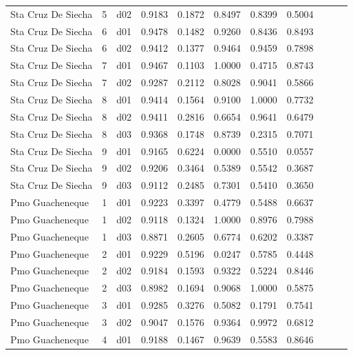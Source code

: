 \begin{landscape}
\begin{longtable}{p{5cm}rrrrrrrrrr}
   Sta Cruz De Siecha  & 5 &     d02 &   0.9183 &  0.1872 &    0.8497 &   0.8399 &    0.5004 \\
   Sta Cruz De Siecha  & 6 &     d01 &   0.9478 &  0.1482 &    0.9260 &   0.8436 &    0.8493 \\
   Sta Cruz De Siecha  & 6 &     d02 &   0.9412 &  0.1377 &    0.9464 &   0.9459 &    0.7898 \\
   Sta Cruz De Siecha  & 7 &     d01 &   0.9467 &  0.1103 &    1.0000 &   0.4715 &    0.8743 \\
   Sta Cruz De Siecha  & 7 &     d02 &   0.9287 &  0.2112 &    0.8028 &   0.9041 &    0.5866 \\
   Sta Cruz De Siecha  & 8 &     d01 &   0.9414 &  0.1564 &    0.9100 &   1.0000 &    0.7732 \\
   Sta Cruz De Siecha  & 8 &     d02 &   0.9411 &  0.2816 &    0.6654 &   0.9641 &    0.6479 \\
   Sta Cruz De Siecha  & 8 &     d03 &   0.9368 &  0.1748 &    0.8739 &   0.2315 &    0.7071 \\
   Sta Cruz De Siecha  & 9 &     d01 &   0.9165 &  0.6224 &    0.0000 &   0.5510 &    0.0557 \\
   Sta Cruz De Siecha  & 9 &     d02 &   0.9206 &  0.3464 &    0.5389 &   0.5542 &    0.3687 \\
   Sta Cruz De Siecha  & 9 &     d03 &   0.9112 &  0.2485 &    0.7301 &   0.5410 &    0.3650 \\
      Pmo Guacheneque  & 1 &     d01 &   0.9223 &  0.3397 &    0.4779 &   0.5488 &    0.6637 \\
      Pmo Guacheneque  & 1 &     d02 &   0.9118 &  0.1324 &    1.0000 &   0.8976 &    0.7988 \\
      Pmo Guacheneque  & 1 &     d03 &   0.8871 &  0.2605 &    0.6774 &   0.6202 &    0.3387 \\
      Pmo Guacheneque  & 2 &     d01 &   0.9229 &  0.5196 &    0.0247 &   0.5785 &    0.4448 \\
      Pmo Guacheneque  & 2 &     d02 &   0.9184 &  0.1593 &    0.9322 &   0.5224 &    0.8446 \\
      Pmo Guacheneque  & 2 &     d03 &   0.8982 &  0.1694 &    0.9068 &   1.0000 &    0.5875 \\
      Pmo Guacheneque  & 3 &     d01 &   0.9285 &  0.3276 &    0.5082 &   0.1791 &    0.7541 \\
      Pmo Guacheneque  & 3 &     d02 &   0.9047 &  0.1576 &    0.9364 &   0.9972 &    0.6812 \\
      Pmo Guacheneque  & 4 &     d01 &   0.9188 &  0.1467 &    0.9639 &   0.5583 &    0.8646 \\

\end{longtable}
\end{landscape}
